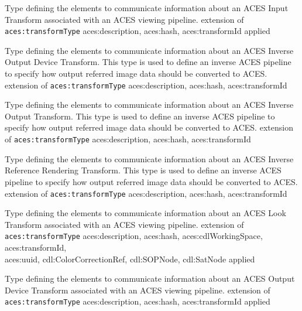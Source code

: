                 {Type defining the elements to communicate information about an ACES Input Transform associated with an ACES viewing pipeline.}
                {extension of \texttt{aces:transformType}}
                {aces:description, aces:hash, aces:transformId}
                {applied}
                
                {Type defining the elements to communicate information about an ACES Inverse Output Device Transform.  This type is used to define an inverse ACES pipeline to specify how output referred image data should be converted to ACES.}
                {extension of \texttt{aces:transformType}}
                {aces:description, aces:hash, aces:transformId}
                
                {Type defining the elements to communicate information about an ACES Inverse Output Transform. This type is used to define an inverse ACES pipeline to specify how output referred image data should be converted to ACES.}
                {extension of \texttt{aces:transformType}}
                {aces:description, aces:hash, aces:transformId}

                {Type defining the elements to communicate information about an ACES Inverse Reference Rendering Transform.  This type is used to define an inverse ACES pipeline to specify how output referred image data should be converted to ACES.}
                {extension of \texttt{aces:transformType}}
                {aces:description, aces:hash, aces:transformId}

                {Type defining the elements to communicate information about an ACES Look Transform associated with an ACES viewing pipeline.}
                {extension of \texttt{aces:transformType}}
                {aces:description, aces:hash, aces:cdlWorkingSpace, aces:transformId,\\ aces:uuid, cdl:ColorCorrectionRef, cdl:SOPNode, cdl:SatNode}
                {applied}
                
                {Type defining the elements to communicate information about an ACES Output Device Transform associated with an ACES viewing pipeline.}
                {extension of \texttt{aces:transformType}}
                {aces:description, aces:hash, aces:transformId}
                {applied}

